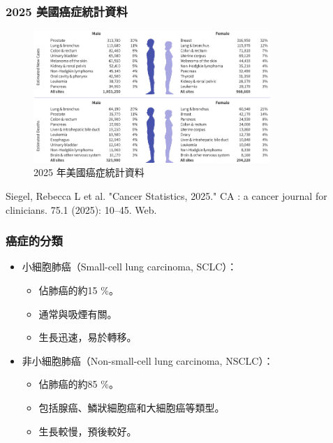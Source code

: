 \documentclass[xcolor=dvipsnames]{beamer}
\begin{document}
    \begin{frame}
        \frametitle{2025 美國癌症統計資料}
        \begin{figure}
            \centering
            \includegraphics[width=0.8\textwidth]{src/cancer_stat.png}
            \caption{2025 年美國癌症統計資料}
            \label{fig:2025_us_cancer_stat}
        \end{figure}
        \footnotesize
        Siegel, Rebecca L et al. "Cancer Statistics, 2025." CA : a cancer journal for clinicians. 75.1 (2025): 10–45. Web.

    \end{frame}

    \begin{frame}
        \frametitle{癌症的分類}
        \begin{itemize}
            \item 小細胞肺癌（Small-cell lung carcinoma, SCLC）：
                \begin{itemize}
                    \item 佔肺癌的約15 \%。
                    \item 通常與吸煙有關。
                    \item 生長迅速，易於轉移。
                \end{itemize}

            \item 非小細胞肺癌（Non-small-cell lung carcinoma, NSCLC）：
                \begin{itemize}
                    \item 佔肺癌的約85 \%。
                    \item 包括腺癌、鱗狀細胞癌和大細胞癌等類型。
                    \item 生長較慢，預後較好。
                \end{itemize}

        \end{itemize}
    \end{frame}
\end{document}
